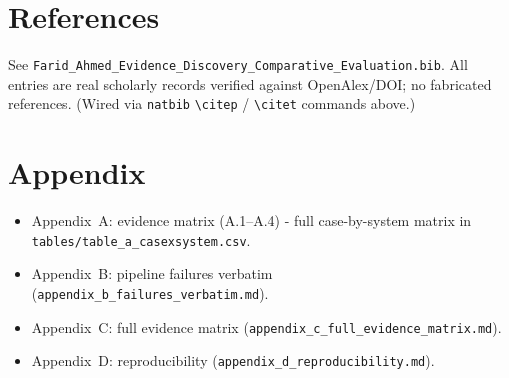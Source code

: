 \documentclass[11pt]{article}
\begin{document}
\section*{References}
\label{sec:refs}
See \texttt{Farid\_Ahmed\_Evidence\_Discovery\_Comparative\_Evaluation.bib}. All
entries are real scholarly records verified against OpenAlex/DOI; no fabricated
references. (Wired via \texttt{natbib} \texttt{\textbackslash citep} /
\texttt{\textbackslash citet} commands above.)




\section*{Appendix}
\label{sec:appendix}
\begin{itemize}
\item Appendix~A: evidence matrix (A.1--A.4) - full case-by-system matrix in \texttt{tables/table_a_casexsystem.csv}.
\item Appendix~B: pipeline failures verbatim (\texttt{appendix\_b\_failures\_verbatim.md}).
\item Appendix~C: full evidence matrix (\texttt{appendix\_c\_full\_evidence\_matrix.md}).
\item Appendix~D: reproducibility (\texttt{appendix\_d\_reproducibility.md}).
\end{itemize}
\end{document}
